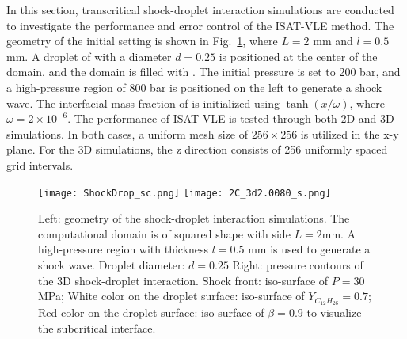 In this section, transcritical shock-droplet interaction simulations are conducted to investigate the performance and error control of the ISAT-VLE method. The geometry of the initial setting is shown in Fig.~\ref{SD_GEO}, where $L=2$ mm and $l=0.5$ mm. A droplet of  with a diameter $d=0.25$ is positioned at the center of the domain, and the domain is filled with . The initial pressure is set to 200 bar, and a high-pressure region of 800 bar is positioned on the left to generate a shock wave. The interfacial mass fraction of  is initialized using $\tanh(x/\omega)$, where $\omega=2 \times 10^{-6}$. The performance of ISAT-VLE is tested through both 2D and 3D simulations. In both cases, a uniform mesh size of $256\times256$ is utilized in the x-y plane. For the 3D simulations, the z direction consists of 256 uniformly spaced grid intervals. 


\begin{figure}[htbp]
\centering
\texttt{[image: ShockDrop\_sc.png]}
\hspace{.7in}
\texttt{[image: 2C\_3d2.0080\_s.png]}
\caption{Left: geometry of the shock-droplet interaction simulations. The computational domain is of squared shape with side $L=2$mm. A high-pressure region with thickness $l=0.5$ mm is used to generate a shock wave. Droplet diameter: $d=0.25$ Right: pressure contours of the 3D shock-droplet interaction. Shock front: iso-surface of $P=30$ MPa; White color on the droplet surface: iso-surface of $Y_{C_{12}H_{26}}=0.7$; Red color on the droplet surface: iso-surface of $\beta =0.9$ to visualize the subcritical interface.}
\label{SD_GEO} 
\end{figure}

